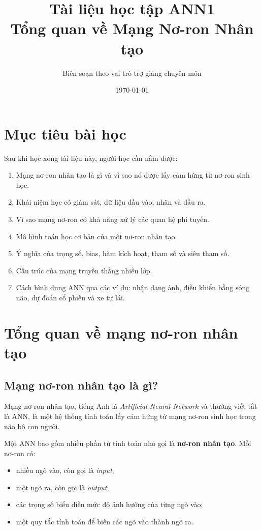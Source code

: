\documentclass[12pt,a4paper]{report}
\title{
    \textbf{Tài liệu học tập ANN1}\\
    \large Tổng quan về Mạng Nơ-ron Nhân tạo
}
\author{Biên soạn theo vai trò trợ giảng chuyên môn}
\date{\today}
\begin{document}
\maketitle
\tableofcontents
\newpage

\chapter*{Mục tiêu bài học}

Sau khi học xong tài liệu này, người học cần nắm được:

\begin{enumerate}[label=\arabic*.]
    \item Mạng nơ-ron nhân tạo là gì và vì sao nó được lấy cảm hứng từ nơ-ron sinh học.
    \item Khái niệm học có giám sát, dữ liệu đầu vào, nhãn và đầu ra.
    \item Vì sao mạng nơ-ron có khả năng xử lý các quan hệ phi tuyến.
    \item Mô hình toán học cơ bản của một nơ-ron nhân tạo.
    \item Ý nghĩa của trọng số, bias, hàm kích hoạt, tham số và siêu tham số.
    \item Cấu trúc của mạng truyền thẳng nhiều lớp.
    \item Cách hình dung ANN qua các ví dụ: nhận dạng ảnh, điều khiển bằng sóng não, dự đoán cổ phiếu và xe tự lái.
\end{enumerate}

\chapter{Tổng quan về mạng nơ-ron nhân tạo}

\section{Mạng nơ-ron nhân tạo là gì?}

Mạng nơ-ron nhân tạo, tiếng Anh là \textit{Artificial Neural Network} và thường viết tắt là ANN, là một hệ thống tính toán lấy cảm hứng từ mạng nơ-ron sinh học trong não bộ con người.

Một ANN bao gồm nhiều phần tử tính toán nhỏ gọi là \textbf{nơ-ron nhân tạo}. Mỗi nơ-ron có:

\begin{itemize}
    \item nhiều ngõ vào, còn gọi là \textit{input};
    \item một ngõ ra, còn gọi là \textit{output};
    \item các trọng số biểu diễn mức độ ảnh hưởng của từng ngõ vào;
    \item một quy tắc tính toán để biến các ngõ vào thành ngõ ra.
\end{itemize}
\end{document}
